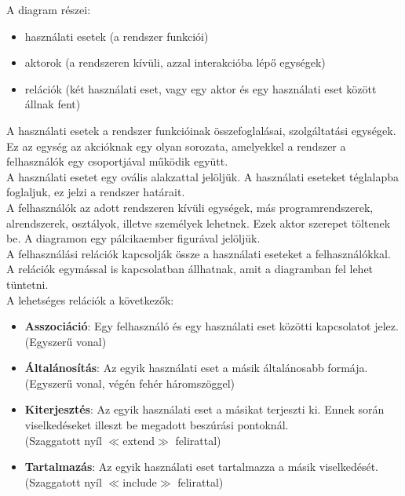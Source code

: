 \documentclass[12pt,margin=0px]{article}
\begin{document}
	\noindent A diagram részei:
	\begin{itemize}
		\item használati esetek (a rendszer funkciói)
		\item aktorok (a rendszeren kívüli, azzal interakcióba lépő egységek)
		\item relációk (két használati eset, vagy egy aktor és egy használati eset között állnak fent)
	\end{itemize}
	
    \noindent A használati esetek a rendszer funkcióinak összefoglalásai, szolgáltatási egységek. Ez az egység az akcióknak egy olyan sorozata, amelyekkel a rendszer a felhasználók egy csoportjával működik együtt.\\
		
    \noindent A használati esetet egy ovális alakzattal jelöljük. A használati eseteket téglalapba foglaljuk, ez jelzi a rendszer határait.\\
		
    \noindent A felhasználók az adott rendszeren kívüli egységek, más programrendszerek, alrendszerek, osztályok, illetve személyek lehetnek. Ezek aktor szerepet töltenek be. A diagramon egy pálcikaember figurával jelöljük.\\
		
    \noindent A felhasználási relációk kapcsolják össze a használati eseteket a felhasználókkal. A relációk egymással is kapcsolatban állhatnak, amit a diagramban fel lehet tüntetni.\\

    \noindent A lehetséges relációk a következők:
		\begin{itemize}
			\item \textbf{Asszociáció}:	Egy felhasználó és egy használati eset közötti kapcsolatot jelez.\\
            (Egyszerű vonal)
			\item \textbf{Általánosítás}: Az egyik használati eset a másik általánosabb formája.\\
            (Egyszerű vonal, végén fehér háromszöggel)
			\item \textbf{Kiterjesztés}: Az egyik használati eset a másikat terjeszti ki. Ennek	során viselkedéseket illeszt be megadott beszúrási pontoknál.\\
            (Szaggatott nyíl $\ll$extend$\gg$ felirattal)
			\item \textbf{Tartalmazás}:	Az egyik használati eset tartalmazza a másik viselkedését.\\
            (Szaggatott nyíl $\ll$include$\gg$ felirattal)
		\end{itemize}
		
\end{document}

